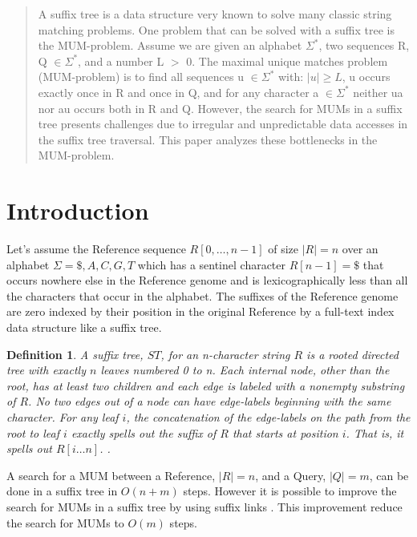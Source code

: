\documentclass[conference]{IEEEtran}
\begin{document}




\maketitle


\begin{abstract}
  A suffix tree is a data structure very known to solve many classic string matching problems. One problem that can be solved with a suffix tree is the MUM-problem. Assume we are given an alphabet $\Sigma^*$, two sequences R, Q $\in \Sigma^*$, and a number L $>$ 0. The maximal unique matches problem (MUM-problem) is to find all sequences u $\in \Sigma^*$ with: $|u|\geq L$, u occurs exactly once in R and once in Q, and for any character a $\in \Sigma^*$ neither ua nor au occurs both in R and Q. However, the search for MUMs in a suffix tree presents challenges due to irregular and unpredictable data accesses in the suffix tree traversal. This paper analyzes these bottlenecks in the MUM-problem.
\end{abstract}
\IEEEpeerreviewmaketitle



\section{Introduction}
Let's assume the Reference sequence $R[0,\ldots, n-1]$ of size $|R|=n$ over an alphabet $\Sigma={ \$, A, C, G, T}$ which has a sentinel character $R[n-1] = \$$ that occurs nowhere else in the Reference genome and is lexicographically less than all the characters that occur in the alphabet. The suffixes of the Reference genome are zero indexed by their position in the original Reference by a full-text index data structure like a suffix tree. 
\newtheorem{mydef}{Definition}
\begin{mydef}
A suffix tree, $ST$, for an n-character string $R$ is a rooted directed tree with exactly $n$ leaves numbered 0 to n. Each internal node, other than the root, has at least two children and each edge is labeled with a nonempty substring of $R$. No two edges out of a node can have edge-labels beginning with the same character. For any leaf $i$, the concatenation of the edge-labels on the path from the root to leaf $i$ exactly spells out the suffix of $R$ that starts at position $i$. That is, it spells out $R[i\ldots n]$. \cite{Gusfield1997}.
\end{mydef}
A search for a MUM between a Reference, $|R|=n$, and a Query, $|Q|=m$,  can be done in a suffix tree in $O(n+m)$ steps. However it is possible to improve the search for MUMs in a suffix tree by using suffix links \cite{Chang1991}. This improvement reduce the search for MUMs to $O(m)$ steps.
\end{document}
